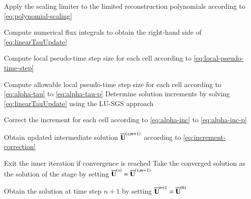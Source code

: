 \begin{algorithm}[htbp!]
\begin{algorithmic}[1]
        \State Apply the scaling limiter to the limited reconstruction polynomials according to \eqref{eq:polynomial-scaling}
        
        \State Compute numerical flux integrals to obtain the right-hand side of \eqref{eq:linearTauUpdate} %
        
        \State Compute local pseudo-time step size for each cell according to \eqref{eq:local-pseudo-time-step}

        \State Compute allowable local pseudo-time step size for each cell according to \eqref{eq:alpha-tau} to \eqref{eq:alpha-tau-p}
        \State Determine solution increments by solving \eqref{eq:linearTauUpdate} using the LU-SGS approach  %

        \State Correct the increment for each cell according to \eqref{eq:alpha-inc} to \eqref{eq:alpha-inc-p}

        \State Obtain updated intermediate solution $\overline{\mathbf{U}}^{\left(s,m+1\right)}$ according to \eqref{eq:increment-correction} %

        \State Exit the inner iteration if convergence is reached
		\EndFor
        \State Take the converged solution as the solution of the stage by setting $\overline{\mathbf{U}}^{\left(s\right)}=\overline{\mathbf{U}}^{\left(s,m+1\right)}$ %
		\EndFor
 	
        \State Obtain the solution at time step $n+1$ by setting $\overline{\mathbf{U}}^{n+1} =\overline{\mathbf{U}}^{\left(6\right)}$ %

 	\EndFunction 
 		
 		
 		
 		

\end{algorithmic}
\end{algorithm}
